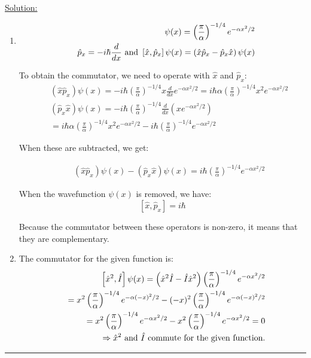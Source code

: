 \noindent
\underline{Solution:}\\
\begin{enumerate}
\item 
\begin{eqnarray}
\nonumber
& & \psi(x) = \left(\frac{\pi}{\alpha}\right)^{-1/4}e^{-\alpha x^2/2}\\
\nonumber
& & \hat{p}_x = -i\hbar\frac{d}{dx}\textnormal{ and }\left[\hat{x},\hat{p}_x\right]\psi(x) = \left(\hat{x}\hat{p}_x - \hat{p}_x\hat{x}\right)\psi(x)
\end{eqnarray}

To obtain the commutator, we need to operate with $\hat{x}$ and $\hat{p}_x$:
\begin{eqnarray}
\nonumber
& & \left(\hat{x}\hat{p}_x\right)\psi(x) = -i\hbar\left(\frac{\pi}{\alpha}\right)^{-1/4}x\frac{d}{dx}e^{-\alpha x^2/2} = i\hbar\alpha\left(\frac{\pi}{\alpha}\right)^{-1/4}x^2e^{-\alpha x^2/2}\\
\nonumber
& & \left(\hat{p}_x\hat{x}\right)\psi(x) = -i\hbar\left(\frac{\pi}{\alpha}\right)^{-1/4}\frac{d}{dx}\left(xe^{-\alpha x^2/2}\right)\\
\nonumber
& & = i\hbar\alpha\left(\frac{\pi}{\alpha}\right)^{-1/4}x^2e^{-\alpha x^2/2} - i\hbar\left(\frac{\pi}{\alpha}\right)^{-1/4}e^{-\alpha x^2/2}
\end{eqnarray}

When these are subtracted, we get:

\begin{eqnarray}
\nonumber
& & \left(\hat{x}\hat{p}_x\right)\psi(x) - \left(\hat{p}_x\hat{x}\right)\psi(x) = i\hbar\left(\frac{\pi}{\alpha}\right)^{-1/4}e^{-\alpha x^2/2}
\end{eqnarray}

When the wavefunction $\psi(x)$ is removed, we have:
$$\left[\hat{x},\hat{p}_x\right] = i\hbar$$

Because the commutator between these operators is non-zero, it means that they are complementary.

\item The commutator for the given function is:
\begin{eqnarray}
\nonumber
& & \left[\hat{x}^2,\hat{I}\right]\psi(x) = \left(\hat{x}^2\hat{I} - \hat{I}\hat{x}^2\right)\left(\frac{\pi}{\alpha}\right)^{-1/4}e^{-\alpha x^2/2}\\
\nonumber
& & = x^2\left(\frac{\pi}{\alpha}\right)^{-1/4}e^{-\alpha (-x)^2/2} - (-x)^2\left(\frac{\pi}{\alpha}\right)^{-1/4}e^{-\alpha (-x)^2/2}\\
\nonumber
& & = x^2\left(\frac{\pi}{\alpha}\right)^{-1/4}e^{-\alpha x^2/2} - x^2\left(\frac{\pi}{\alpha}\right)^{-1/4}e^{-\alpha x^2/2} = 0\\
\nonumber
& & \Rightarrow \hat{x}^2\textnormal{ and }\hat{I}\textnormal{ commute for the given function.}
\end{eqnarray}

\end{enumerate}

\hrule\vspace{0.5cm}
